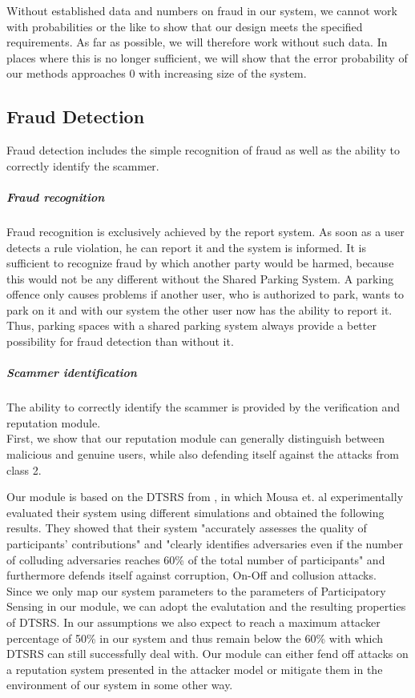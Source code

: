 \documentclass[
a4paper,     %
titlepage,   %
14pt         %
]{scrartcl}  %
\theoremstyle{mystyle}
\begin{document}
Without established data and numbers on fraud in our system, we cannot work with probabilities or the like to show that our design meets the specified requirements. As far as possible, we will therefore work without such data. In places where this is no longer sufficient, we will show that the error probability of our methods approaches 0 with increasing size of the system.

\subsection{Fraud Detection}
Fraud detection includes the simple recognition of fraud as well as the ability to correctly identify the scammer.  \\

\subparagraph{Fraud recognition} Fraud recognition is exclusively achieved by the report system. As soon as a user detects a rule violation, he can report it and the system is informed. It is sufficient to recognize fraud by which another party would be harmed, because this would not be any different without the Shared Parking System. A parking offence only causes problems if another user, who is authorized to park, wants to park on it and with our system the other user now has the ability to report it. Thus, parking spaces with a shared parking system always provide a better possibility for fraud detection than without it. \\

\subparagraph{Scammer identification}The ability to correctly identify the scammer is provided by the verification and reputation module. \\

First, we show that our reputation module can generally distinguish between malicious and genuine users, while also defending itself against the attacks from class 2.

Our module is based on the DTSRS from \cite{mousa2017reputation}, in which Mousa et. al experimentally evaluated their system using different simulations and obtained the following results. They showed that their system "accurately assesses the quality of participants' contributions" and "clearly identifies adversaries even if the number of colluding adversaries reaches 60\% of the total number of participants" and furthermore defends itself against corruption, On-Off and collusion attacks. \\

Since we only map our system parameters to the parameters of Participatory Sensing in our module, we can adopt the evalutation and the resulting properties of DTSRS. In our assumptions we also expect to reach a maximum attacker percentage of 50\% in our system and thus remain below the 60\% with which DTSRS can still successfully deal with. Our module can either fend off attacks on a reputation system presented in the attacker model or mitigate them in the environment of our system in some other way.
\end{document}
